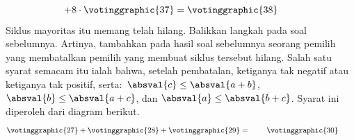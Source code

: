 \begin{exercises}
\begin{answer}
\begin{exparts}
\begin{equation*}
         +8\cdot\votinggraphic{37}
         =\votinggraphic{38}
       \tag*{}\end{equation*}
       Siklus mayoritas itu memang telah hilang.
      \partsitem Balikkan langkah pada soal sebelumnya.
         Artinya, tambahkan pada hasil soal sebelumnya seorang pemilih yang
         membatalkan pemilih yang membuat siklus tersebut hilang.
      \partsitem Salah satu syarat semacam itu ialah bahwa, setelah pembatalan,
         ketiganya tak negatif atau ketiganya tak positif,
         serta:~$\absval{c}\leq\absval{a+b}$, $\absval{b}\leq\absval{a+c}$,
         dan $\absval{a}\leq\absval{b+c}$.
         Syarat ini diperoleh dari diagram berikut.
         \begin{equation*}
           \votinggraphic{27}  %
           +  
           \votinggraphic{28}  %
           +  
           \votinggraphic{29}  %
           =\hspace{.30in}
           \votinggraphic{30}  %
           \hspace{.30in}\hbox{}  
         \end{equation*}

\end{exparts}
\end{answer}
\end{exercises}
